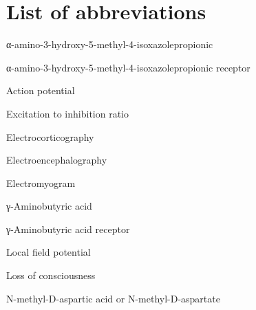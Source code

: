 \chapter{List of abbreviations}
\label{sec:abbr}


\normalsize
\renewcommand{\thefigure}{A.\arabic{figure}}
\renewcommand{\figurename}{Fig.}
\setcounter{figure}{0}

\setlength{\parindent}{0pt}
\setlength{\parskip}{3pt}

         \tabto{5.5em}    α-amino-3-hydroxy-5-methyl-4-isoxazolepropionic

        \tabto{5.5em}    α-amino-3-hydroxy-5-methyl-4-isoxazolepropionic receptor

           \tabto{5.5em}    Action potential

    \tabto{5.5em}    Excitation to inhibition ratio

         \tabto{5.5em}    Electrocorticography

          \tabto{5.5em}    Electroencephalography

          \tabto{5.5em}    Electromyogram

         \tabto{5.5em}    γ-Aminobutyric acid

        \tabto{5.5em}    γ-Aminobutyric acid receptor

          \tabto{5.5em}    Local field potential

          \tabto{5.5em}    Loss of consciousness

         \tabto{5.5em}    N-methyl-D-aspartic acid or N-methyl-D-aspartate

\setlength{\parindent}{16pt}
\setlength{\parskip}{6pt}